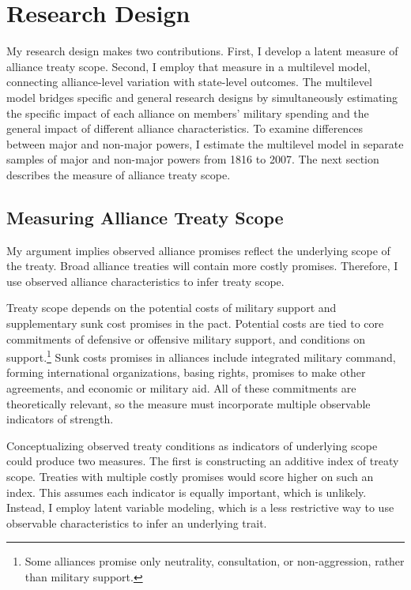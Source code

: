 \documentclass[12pt]{article}
\begin{document}
\section{Research Design} 


My research design makes two contributions. 
First, I develop a latent measure of alliance treaty scope. 
Second, I employ that measure in a multilevel model, connecting alliance-level variation with state-level outcomes. 
The multilevel model bridges specific and general research designs by simultaneously estimating the specific impact of each alliance on members' military spending and the general impact of different alliance characteristics. 
To examine differences between major and non-major powers, I estimate the multilevel model in separate samples of major and non-major powers from 1816 to 2007. 
The next section describes the measure of alliance treaty scope. 


\subsection{Measuring Alliance Treaty Scope} 


My argument implies observed alliance promises reflect the underlying scope of the treaty. 
Broad alliance treaties will contain more costly promises. 
Therefore, I use observed alliance characteristics to infer treaty scope.


Treaty scope depends on the potential costs of military support and supplementary sunk cost promises in the pact. 
Potential costs are tied to core commitments of defensive or offensive military support, and conditions on support.\footnote{Some alliances promise only neutrality, consultation, or non-aggression, rather than military support.}  
Sunk costs promises in alliances include integrated military command, forming international organizations, basing rights, promises to make other agreements, and economic or military aid. 
All of these commitments are theoretically relevant, so the measure must incorporate multiple observable indicators of strength. 


Conceptualizing observed treaty conditions as indicators of underlying scope could produce two measures. 
The first is constructing an additive index of treaty scope. 
Treaties with multiple costly promises would score higher on such an index. 
This assumes each indicator is equally important, which is unlikely. 
Instead, I employ latent variable modeling, which is a less restrictive way to use observable characteristics to infer an underlying trait. 
\end{document}
